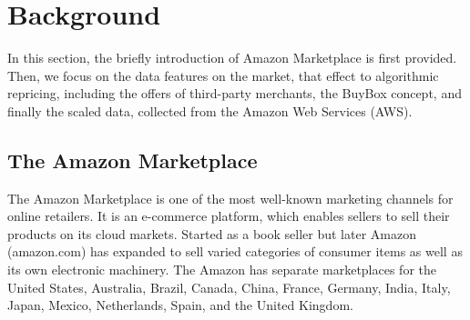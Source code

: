 \section{Background}
\label{sec:Background}
In this section, the briefly introduction of Amazon Marketplace is first provided. Then, we focus on the data features on the market, that effect to algorithmic repricing, including the offers of third-party merchants, the BuyBox concept, and finally the scaled data, collected from the Amazon Web Services (AWS).

\subsection{The Amazon Marketplace}
\label{sec:amzintro}
The Amazon Marketplace is one of the most well-known marketing channels for online retailers. It is an e-commerce platform, which enables  sellers to sell their products on its cloud markets. Started as a book seller but later Amazon (amazon.com) has expanded to sell varied categories of consumer items as well as its own electronic machinery. The Amazon has separate marketplaces for the United States, Australia, Brazil, Canada, China, France, Germany, India, Italy, Japan, Mexico, Netherlands, Spain, and the United Kingdom.

